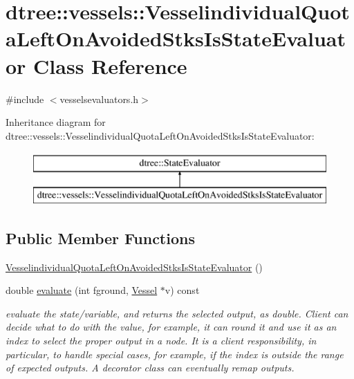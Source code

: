 \hypertarget{classdtree_1_1vessels_1_1_vesselindividual_quota_left_on_avoided_stks_is_state_evaluator}{}\section{dtree\+::vessels\+::Vesselindividual\+Quota\+Left\+On\+Avoided\+Stks\+Is\+State\+Evaluator Class Reference}
\label{classdtree_1_1vessels_1_1_vesselindividual_quota_left_on_avoided_stks_is_state_evaluator}


{\ttfamily \#include $<$vesselsevaluators.\+h$>$}

Inheritance diagram for dtree\+::vessels\+::Vesselindividual\+Quota\+Left\+On\+Avoided\+Stks\+Is\+State\+Evaluator\+:\begin{figure}[H]
\begin{center}
\leavevmode
\includegraphics[height=2.000000cm]{dd/d5c/classdtree_1_1vessels_1_1_vesselindividual_quota_left_on_avoided_stks_is_state_evaluator}
\end{center}
\end{figure}
\subsection*{Public Member Functions}
\begin{DoxyCompactItemize}
\item 
\mbox{\hyperlink{classdtree_1_1vessels_1_1_vesselindividual_quota_left_on_avoided_stks_is_state_evaluator_a42410c011f89caa4887fef268abe4eb2}{Vesselindividual\+Quota\+Left\+On\+Avoided\+Stks\+Is\+State\+Evaluator}} ()
\item 
double \mbox{\hyperlink{classdtree_1_1vessels_1_1_vesselindividual_quota_left_on_avoided_stks_is_state_evaluator_a946ed372cfcc94aeeb9f4c390cfc14bf}{evaluate}} (int fground, \mbox{\hyperlink{class_vessel}{Vessel}} $\ast$v) const
\begin{DoxyCompactList}\small\item\em evaluate the state/variable, and returns the selected output, as double. Client can decide what to do with the value, for example, it can round it and use it as an index to select the proper output in a node. It is a client responsibility, in particular, to handle special cases, for example, if the index is outside the range of expected outputs. A decorator class can eventually remap outputs. \end{DoxyCompactList}\end{DoxyCompactItemize}


